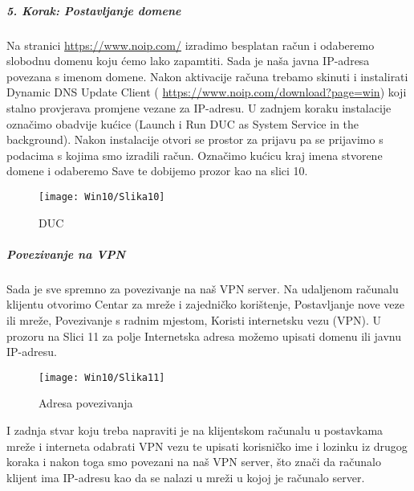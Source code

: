 \FloatBarrier
\subparagraph{5. Korak: Postavljanje domene}
\hfill \smallbreak
Na stranici \url{https://www.noip.com/} izradimo besplatan račun i odaberemo slobodnu domenu koju ćemo lako zapamtiti. Sada je naša javna IP-adresa povezana s imenom domene. Nakon aktivacije računa trebamo skinuti i instalirati Dynamic DNS Update Client ( \url{https://www.noip.com/download?page=win}) koji stalno provjerava promjene vezane za IP-adresu. U zadnjem koraku instalacije označimo obadvije kućice (Launch i Run DUC as System Service in the background). Nakon instalacije otvori se prostor za prijavu pa se prijavimo s podacima s kojima smo izradili račun. Označimo kućicu kraj imena stvorene domene i odaberemo Save te dobijemo prozor kao na slici 10. 
\FloatBarrier
\FloatBarrier
\begin{figure}[h!]
	\centering
     \texttt{[image: Win10/Slika10]}
     \caption{DUC}
\end{figure}
\FloatBarrier
\subparagraph{Povezivanje na VPN}
\hfill \smallbreak
Sada je sve spremno za povezivanje na naš VPN server. Na udaljenom računalu klijentu otvorimo Centar za mreže i zajedničko korištenje, Postavljanje nove veze ili mreže, Povezivanje s radnim mjestom, Koristi internetsku vezu (VPN). U prozoru na Slici 11 za polje Internetska adresa možemo upisati domenu ili javnu IP-adresu.
\FloatBarrier
\begin{figure}[h!]
	\centering
     \texttt{[image: Win10/Slika11]}
     \caption{Adresa povezivanja}
\end{figure}
\FloatBarrier
I zadnja stvar koju treba napraviti je na klijentskom računalu u postavkama mreže i interneta odabrati VPN vezu te upisati korisničko ime i lozinku iz drugog koraka i nakon toga smo povezani na naš VPN server, što znači da računalo klijent ima IP-adresu kao da se nalazi u mreži u kojoj je računalo server.

\FloatBarrier